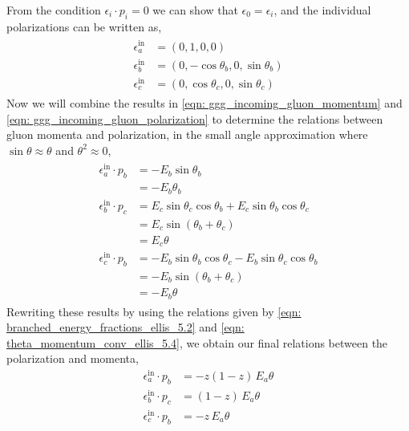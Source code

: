 \documentclass[main.tex]{subfiles}
\begin{document}
From the condition \(\epsilon_i \cdot p_i =0\) we can show that \(\epsilon_0 = \epsilon_i\), 
and the individual polarizations can be written as, 
\begin{align}\label{eqn: ggg_incoming_gluon_polarization}
    \begin{split}
    \epsilon^{\text{in}}_a &= \left( 0, 1, 0, 0\right)  \\
    \epsilon^{\text{in}}_b &= \left( 0, - \cos \theta_b, 0, \sin \theta_b \right) \\
    \epsilon^{\text{in}}_c &= \left( 0, \cos \theta_c, 0, \sin \theta_c \right) 
    \end{split}
\end{align}
Now we will combine the results in \autoref{eqn: ggg_incoming_gluon_momentum} and \autoref{eqn: ggg_incoming_gluon_polarization} to determine the relations between gluon momenta and polarization, in the small angle approximation where \(\sin \theta \approx \theta\) and \(\theta^2 \approx 0\), 
\begin{align}
    \begin{split}
    \epsilon^{\text{in}}_a \cdot p_b &= -E_b \sin \theta_b\\
        &= -E_b \theta_b \\
    \epsilon^{\text{in}}_b \cdot p_c &= E_c \sin \theta_c \cos \theta_b + E_c \sin \theta_b \cos \theta_c \\
    &= E_c \sin (\theta_b+\theta_c)  \\
    &= E_c \theta \\
    \epsilon^{\text{in}}_c \cdot p_b &= -E_b \sin \theta_b \cos \theta_c - E_b \sin \theta_c \cos \theta_b \\
    &= -E_b \sin(\theta_b+\theta_c) \\
    &= -E_b \theta
    \end{split}
\end{align}
Rewriting these results by using the relations given by \autoref{eqn: branched_energy_fractions_ellis_5.2} and \autoref{eqn: theta_momentum_conv_ellis_5.4}, we obtain our final relations between the polarization and momenta, 
\begin{align}\label{eqn: ggg_polarization_momta_relations_ellis_5.8}
    \epsilon^{\text{in}}_a \cdot p_b &= -z(1-z)\, E_a \theta \nonumber \\
    \epsilon^{\text{in}}_b \cdot p_c &= (1-z)\, E_a \theta\\
    \epsilon^{\text{in}}_c \cdot p_b &= -z\, E_a \theta \nonumber
\end{align}
\end{document}
